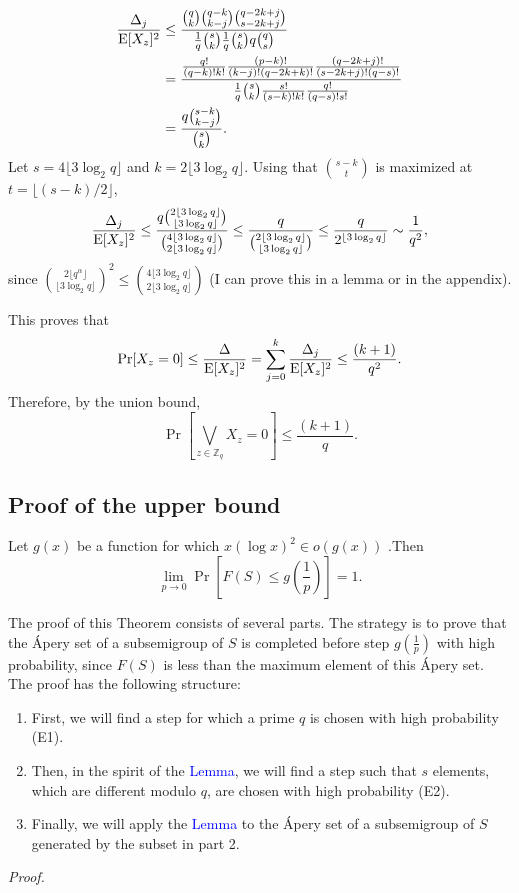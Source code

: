 \begin{align*}
    \frac{\Delta_j}{\mathrm{E}[X_z]^2} &\leq \frac{\binom{q}{k} \binom{q - k}{k - j}\binom{q - 2k + j}{s - 2k + j}}{\frac{1}{q} \binom{s}{k}\frac{1}{q} \binom{s}{k}q\binom{q}{s}} \\
    &= \frac{\frac{q!}{(q - k)!k!}\frac{(p - k)!}{(k - j)!(q - 2k + k)!}\frac{(q - 2k + j)!}{(s - 2k + j)!(q - s)!}}{\frac{1}{q}\binom{s}{k}\frac{s!}{(s - k)!k!}\frac{q!}{(q - s)!s!}} \\
    &= \frac{q\binom{s - k}{k - j}}{\binom{s}{k}}.
\end{align*}
Let $s = 4\lfloor 3 \log_2 q \rfloor$ and $k = 2\lfloor 3 \log_2 q \rfloor$. Using that $\binom{s - k}{t}$ is maximized at $t = \lfloor (s - k) / 2\rfloor$,
\begin{align*}
\frac{\Delta_j}{\mathrm{E}[X_z]^2} \leq \frac{q \binom{2\lfloor 3 \log_2 q\rfloor}{\lfloor 3 \log_2 q \rfloor}}{\binom{4\lfloor 3\log_2 q \rfloor}{2\lfloor 3\log_2 q \rfloor}} \leq \frac{q}{\binom{2\lfloor 3 \log_2 q \rfloor }{ \lfloor 3 \log_2 q \rfloor}} \leq \frac{q}{2^{\lfloor 3 \log_2 q \rfloor}} \sim \frac{1}{q^2},
\end{align*}
since \(\binom{2\lfloor q^{\alpha} \rfloor}{\lfloor 3 \log_2 q \rfloor}^2 \leq \binom{4\lfloor 3 \log_2 q \rfloor }{2\lfloor 3 \log_2 q \rfloor}\) (I can prove this in a lemma or in the appendix).   \par
This proves that
\[\mathrm{Pr}[X_z = 0] \leq \frac{\Delta}{\mathrm{E}[X_z]^2} = \sum_{j = 0}^k \frac{\Delta_j}{\mathrm{E}[X_z]^2} \leq \frac{(k + 1)}{q^2}.\]
Therefore, by the union bound,
\[\Pr[\bigvee_{z \in \mathbb{Z}_q} X_z = 0] \leq \frac{(k + 1)}{q}.\]

\subsection{Proof of the upper bound} 
\begin{theorem}\label{thm:upperbound}
    Let $g(x)$ be a function for which $x(\log x)^2 \in o(g(x))$ .Then
    \[\lim_{p \to 0}\Pr\left[F(S) \leq g\left(\frac{1}{p}\right)\right] = 1.\] 
\end{theorem}

\par The proof of this Theorem consists of several parts. The strategy is to prove that the Ápery set of a subsemigroup of $S$ is completed before step $g\left(\frac{1}{p}\right)$ with high probability, since $F(S)$ is less than the maximum element of this Ápery set. The proof has the following structure: 
\begin{enumerate}
\item First, we will find a step for which a prime $q$ is chosen with high probability (E1). 
\item Then, in the spirit of the \textcolor{blue}{Lemma}, we will find a step such that $s$ elements, which are different modulo $q$, are chosen with high probability (E2). 
\item Finally, we will apply the \textcolor{blue}{Lemma} to the Ápery set of a subsemigroup of $S$ generated by the subset in part 2. 
\end{enumerate}
\textit{Proof. }
